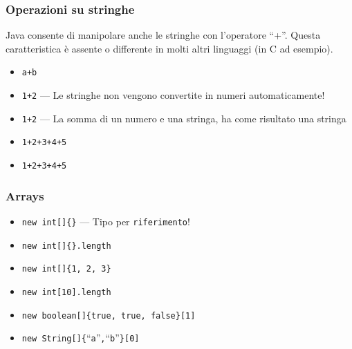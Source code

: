 \documentclass{beamer}
\begin{document}
\begin{frame}
\frametitle{Operazioni su stringhe}
Java consente di manipolare anche le stringhe con l'operatore ``+''. Questa caratteristica è assente o differente in molti altri linguaggi (in C ad esempio).
\begin{itemize}
 \item \texttt{\textquotedbl{}a\textquotedbl{}+\textquotedbl{}b\textquotedbl{}}
 \item \texttt{\textquotedbl{}1\textquotedbl{}+\textquotedbl{}2\textquotedbl{}} --- Le stringhe non vengono convertite in numeri automaticamente!
 \item \texttt{1+\textquotedbl{}2\textquotedbl{}} --- La somma di un numero e una stringa, ha come risultato una stringa
 \item \texttt{1+2+\textquotedbl{}3\textquotedbl{}+4+5}
 \item \texttt{1+2+\textquotedbl{}3\textquotedbl{}+\textquotedbl{}4\textquotedbl{}+\textquotedbl{}5\textquotedbl{}}
\end{itemize}
\end{frame}

\begin{frame}
\frametitle{Arrays}
\begin{itemize}
 \item \texttt{new int[]\{\}} --- Tipo per \texttt{riferimento}!
 \item \texttt{new int[]\{\}.length}
 \item \texttt{new int[]\{1, 2, 3\}}
 \item \texttt{new int[10].length}
 \item \texttt{new boolean[]\{true, true, false\}[1]}
 \item \texttt{new String[]\{}``\texttt{a}''\texttt{,}``\texttt{b}''\texttt{\}[0]}
\end{itemize}
\end{frame}

% 
\end{document}
